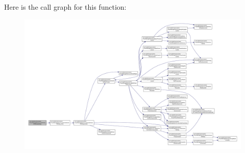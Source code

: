 Here is the call graph for this function\-:
\nopagebreak
\begin{figure}[H]
\begin{center}
\leavevmode
\includegraphics[width=350pt]{classcom_1_1android_1_1server_1_1power_1_1PowerManagerService_ac3f7d0be2dfe51cbc4f4adfd11a8c58a_cgraph}
\end{center}
\end{figure}


